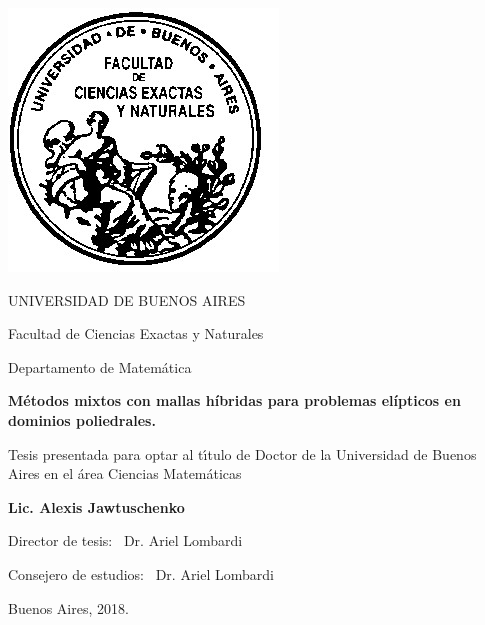 \documentclass[12pt,a4paper,openany,oneside]{book}
\begin{document}
\thispagestyle{empty}

\begin {center}

\includegraphics[scale=.3]{logofac.jpg}

\medskip
UNIVERSIDAD DE BUENOS AIRES

Facultad de Ciencias Exactas y Naturales

Departamento de Matem\'atica

\vspace{3cm}

\textbf{\large M\'etodos mixtos con mallas h\'ibridas para problemas el\'ipticos
en dominios poliedrales.}

\vspace{2cm}

Tesis presentada para optar al t\'\i tulo de Doctor de la Universidad de Buenos Aires en el \'area Ciencias Matem\'aticas

\vspace{2cm}

\textbf{Lic. Alexis Jawtuschenko}

\end {center}

\vspace{1.5cm}

\noindent Director de tesis: \ Dr. Ariel Lombardi

\noindent Consejero de estudios: \ Dr. Ariel Lombardi

\vspace{1cm}

\noindent Buenos Aires, 2018.
\newpage
\end{document}
